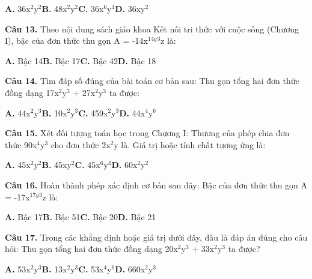 \documentclass[11pt,a4paper]{article}
\begin{document}
\hspace*{1.5em}\textbf{A.} 36x$^2$y$^2$\quad\quad \textbf{B.} 48x$^2$y$^2$\quad\quad \textbf{C.} 36x$^6$y$^4$\quad\quad \textbf{D.} 36xy$^2$\par\vspace{2pt}
\textbf{\color{primary} Câu 13.} Theo nội dung sách giáo khoa Kết nối tri thức với cuộc sống (Chương I), bậc của đơn thức thu gọn A = -14x$^{14y}$$^3$z là:\par
\hspace*{1.5em}\textbf{A.} Bậc 14\quad\quad \textbf{B.} Bậc 17\quad\quad \textbf{C.} Bậc 42\quad\quad \textbf{D.} Bậc 18\par\vspace{2pt}
\textbf{\color{primary} Câu 14.} Tìm đáp số đúng của bài toán cơ bản sau: Thu gọn tổng hai đơn thức đồng dạng 17x$^2$y$^3$ + 27x$^2$y$^3$ ta được:\par
\hspace*{1.5em}\textbf{A.} 44x$^2$y$^3$\quad\quad \textbf{B.} 10x$^2$y$^3$\quad\quad \textbf{C.} 459x$^2$y$^3$\quad\quad \textbf{D.} 44x$^4$y$^6$\par\vspace{2pt}
\textbf{\color{primary} Câu 15.} Xét đối tượng toán học trong Chương I: Thương của phép chia đơn thức 90x$^4$y$^3$ cho đơn thức 2x$^2$y là. Giá trị hoặc tính chất tương ứng là:\par
\hspace*{1.5em}\textbf{A.} 45x$^2$y$^2$\quad\quad \textbf{B.} 45xy$^2$\quad\quad \textbf{C.} 45x$^6$y$^4$\quad\quad \textbf{D.} 60x$^2$y$^2$\par\vspace{2pt}
\textbf{\color{primary} Câu 16.} Hoàn thành phép xác định cơ bản sau đây: Bậc của đơn thức thu gọn A = -17x$^{17y}$$^3$z là:\par
\hspace*{1.5em}\textbf{A.} Bậc 17\quad\quad \textbf{B.} Bậc 51\quad\quad \textbf{C.} Bậc 20\quad\quad \textbf{D.} Bậc 21\par\vspace{2pt}
\textbf{\color{primary} Câu 17.} Trong các khẳng định hoặc giá trị dưới đây, đâu là đáp án đúng cho câu hỏi: Thu gọn tổng hai đơn thức đồng dạng 20x$^2$y$^3$ + 33x$^2$y$^3$ ta được?\par
\hspace*{1.5em}\textbf{A.} 53x$^2$y$^3$\quad\quad \textbf{B.} 13x$^2$y$^3$\quad\quad \textbf{C.} 53x$^4$y$^6$\quad\quad \textbf{D.} 660x$^2$y$^3$\par\vspace{2pt}
\end{document}
